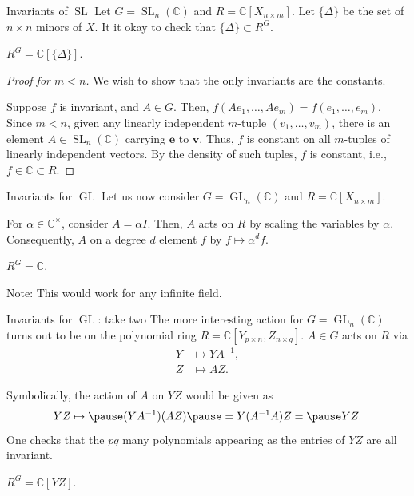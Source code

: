 \documentclass{beamer}
\DeclareMathOperator{\GL}{GL}
\DeclareMathOperator{\SL}{SL}
\begin{document}
	\begin{frame}{Invariants of \texorpdfstring{$\SL$}{SL}}
		Let $G = \SL_{n}(\mathbb{C})$ and $R = \mathbb{C}[X_{n \times m}]$. \pause Let $\{\Delta\}$ be the set of $n \times n$ minors of $X$. \pause It it okay to check that $\{\Delta\} \subset R^{G}$. \pause

		\begin{theorem}
			$R^{G} = \mathbb{C}[\{\Delta\}]$.
		\end{theorem}
		\pause
		\begin{proof}[Proof for $m < n$]
			We wish to show that the only invariants are the constants. \pause

			Suppose $f$ is invariant, and $A \in G$. \pause Then, $f(Ae_{1}, \ldots, Ae_{m}) = f(e_{1}, \ldots, e_{m})$. \pause Since $m < n$, given any linearly independent $m$-tuple $(v_{1}, \ldots, v_{m})$, there is an element $A \in \SL_{n}(\mathbb{C})$ carrying $\mathbf{e}$ to $\mathbf{v}$. \pause Thus, $f$ is constant on all $m$-tuples of linearly independent vectors. \pause By the density of such tuples, $f$ is constant, i.e., $f \in \mathbb{C} \subset R$.
		\end{proof}
	\end{frame}

	\begin{frame}{Invariants for \texorpdfstring{$\GL$}{GL}}
		Let us now consider $G = \GL_{n}(\mathbb{C})$ and $R = \mathbb{C}[X_{n \times m}]$. \pause

		For $\alpha \in \mathbb{C}^{\times}$, consider $A = \alpha I$. \pause Then, $A$ acts on $R$ by scaling the variables by $\alpha$. \pause Consequently, $A$ on a degree $d$ element $f$ by $f \mapsto \alpha^{d} f$. \pause

		\begin{corollary}
			$R^{G} = \mathbb{C}$.
		\end{corollary}

		\pause Note: This would work for any infinite field.
	\end{frame}

	\begin{frame}{Invariants for \texorpdfstring{$\GL$}{GL}: take two}
		The more interesting action for $G = \GL_{n}(\mathbb{C})$ turns out to be on the polynomial ring $R = \mathbb{C}[Y_{p \times n}, Z_{n \times q}]$. \pause $A \in G$ acts on $R$ via
		\begin{align*} 
			Y &\mapsto Y A^{-1}, \\
			Z &\mapsto AZ.
		\end{align*}

		\pause 
		Symbolically, the action of $A$ on $YZ$ would be given as
		\begin{equation*} 
			YZ \mapsto \pause (Y A^{-1}) (AZ) \pause = Y (A^{-1} A) Z = \pause YZ.
		\end{equation*}
		\pause
		One checks that the $pq$ many polynomials appearing as the entries of $YZ$ are all invariant.

		\pause 
		\begin{theorem}
			$R^{G} = \mathbb{C}[YZ]$.
		\end{theorem}
	\end{frame}
\end{document}
